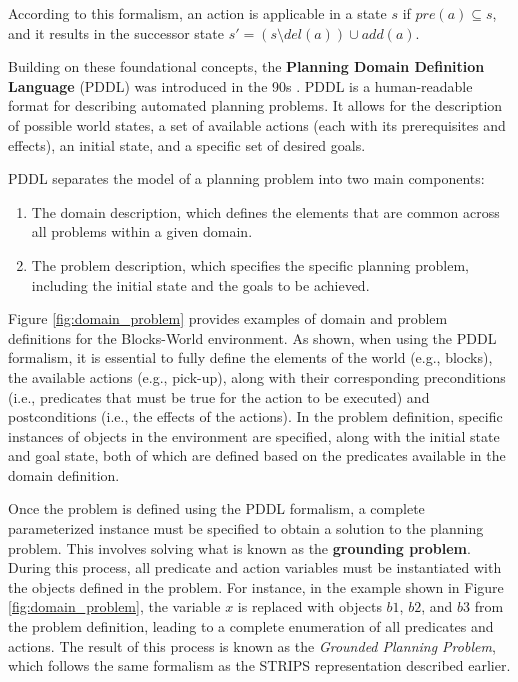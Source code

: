 According to this formalism, an action is applicable in a state $s$ if $pre(a) \subseteq s$, and it results in the successor state $s' = (s \setminus del(a)) \cup add(a)$.

Building on these foundational concepts, the \textbf{Planning Domain Definition Language} (PDDL) was introduced in the 90s \cite{aeronautiques1998pddl}. PDDL is a human-readable format for describing automated planning problems. It allows for the description of possible world states, a set of available actions (each with its prerequisites and effects), an initial state, and a specific set of desired goals.

PDDL separates the model of a planning problem into two main components:
\begin{enumerate}
    \item The domain description, which defines the elements that are common across all problems within a given domain.
    \item The problem description, which specifies the specific planning problem, including the initial state and the goals to be achieved.
\end{enumerate}



Figure \ref{fig:domain_problem} provides examples of domain and problem definitions for the Blocks-World environment. As shown, when using the PDDL formalism, it is essential to fully define the elements of the world (e.g., blocks), the available actions (e.g., pick-up), along with their corresponding preconditions (i.e., predicates that must be true for the action to be executed) and postconditions (i.e., the effects of the actions). In the problem definition, specific instances of objects in the environment are specified, along with the initial state and goal state, both of which are defined based on the predicates available in the domain definition.

Once the problem is defined using the PDDL formalism, a complete parameterized instance must be specified to obtain a solution to the planning problem. This involves solving what is known as the \textbf{grounding problem}. During this process, all predicate and action variables must be instantiated with the objects defined in the problem. For instance, in the example shown in Figure \ref{fig:domain_problem}, the variable \( x \) is replaced with objects \( b1 \), \( b2 \), and \( b3 \) from the problem definition, leading to a complete enumeration of all predicates and actions. The result of this process is known as the \textit{Grounded Planning Problem}, which follows the same formalism as the STRIPS representation described earlier.

